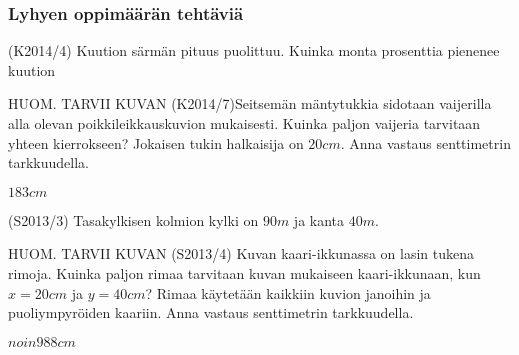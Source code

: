 



\subsubsection*{Lyhyen oppimäärän tehtäviä}


\begin{tehtava}
	(K2014/4)  Kuution särmän pituus puolittuu. Kuinka monta prosenttia pienenee kuution
	\begin{alakohdat}
	\end{alakohdat}
						
						\begin{vastaus}
						\begin{alakohdat}
						 \alakohta{$87,5\%$}
						 \alakohta{$75\%$}
						\end{alakohdat}					  
	\end{vastaus}
	\end{tehtava}

\begin{tehtava}
HUOM. TARVII KUVAN 
(K2014/7)Seitsemän mäntytukkia sidotaan vaijerilla alla olevan poikkileikkauskuvion mukaisesti. Kuinka paljon vaijeria tarvitaan yhteen kierrokseen? Jokaisen tukin halkaisija on $20 cm$.
Anna vastaus senttimetrin tarkkuudella. 
  \begin{vastaus}
  $183 cm$
  \end{vastaus}
\end{tehtava}

\begin{tehtava}(S2013/3) Tasakylkisen kolmion kylki on $90 m$ ja kanta $40 m$.
\begin{alakohdat}
 \end{alakohdat}
    \begin{vastaus}
    \begin{alakohdat}
	\alakohta{$26\circ$}
	\alakohta{$1755 m^2$}
   \end{alakohdat}
 \end{vastaus}
\end{tehtava}

\begin{tehtava}
HUOM. TARVII KUVAN 
(S2013/4) Kuvan kaari-ikkunassa on lasin tukena rimoja. Kuinka paljon rimaa tarvitaan kuvan mukaiseen kaari-ikkunaan, kun $x=20 cm$ ja $y=40 cm$? Rimaa käytetään kaikkiin kuvion janoihin ja puoliympyröiden kaariin. Anna vastaus senttimetrin tarkkuudella.
  \begin{vastaus}
  $noin 988 cm$
  \end{vastaus}
\end{tehtava}

